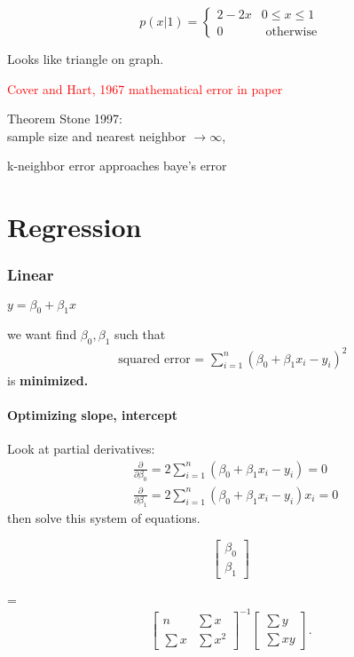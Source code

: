 \documentclass[12pt]{article}
\newcommand{\bt}[1]{\textbf{#1}} %
\newcommand{\eq}[1]{\begin{align*}#1\end{align*}} %
\renewcommand{\eq}[1]{\begin{align*}#1\end{align*}} %
\begin{document}
\begin{displaymath}
   p(x | 1) = \left\{
     \begin{array}{lr}
       2 - 2x &  0 \leq x \leq 1 \\
       0 & \text{ otherwise}
     \end{array}
   \right.
\end{displaymath} 


Looks like triangle on graph.

\textcolor{red}{Cover and Hart, 1967 mathematical error in paper}

Theorem Stone 1997: \\
sample size and nearest neighbor $\rightarrow \infty$, \\
\centerline{k-neighbor error approaches baye's error}

\part*{Regression}

\section*{Linear}
$y = \beta_0 + \beta_1 x$

we want find $\beta_0, \beta_1$ such that 
\eq{
\text{ squared error = } \sum_{i=1}^n (\beta_0 + \beta_1 x_i - y_i)^2
}
is \bt{minimized.}

\subsection*{Optimizing slope, intercept}

Look at partial derivatives: 
\eq{
&\frac{\partial}{\partial \beta_0} = 2 \sum_{i=1}^n (\beta_0 + \beta_1 x_i - y_i) = 0\\
&\frac{\partial}{\partial \beta_1} = 2 \sum_{i=1}^n (\beta_0 + \beta_1 x_i - y_i)x_i = 0
}
then solve this system of equations.


\begin{equation}
\begin{bmatrix}
 \beta_0 \\
 \beta_1 
\end{bmatrix}
\end{equation}

=  
\begin{equation}
\begin{bmatrix}
n & \sum x \\
\sum x & \sum x^2 
\end{bmatrix}^{-1} 
\begin{bmatrix}
    \sum y\\
    \sum xy
\end{bmatrix}. 
\end{equation}
\end{document}
